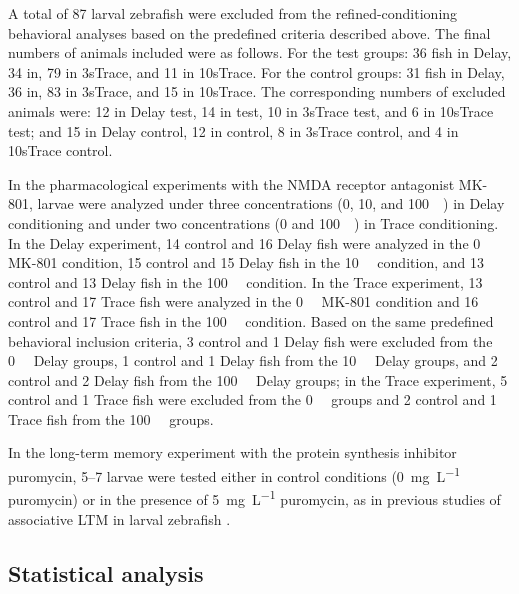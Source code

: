 A total of 87 larval zebrafish were excluded from the refined-conditioning behavioral analyses based on the predefined criteria described above. The final numbers of animals included were as follows. For the test groups: 36 fish in Delay, 34 in, 79 in 3sTrace, and 11 in 10sTrace. For the control groups: 31 fish in Delay, 36 in, 83 in 3sTrace, and 15 in 10sTrace. The corresponding numbers of excluded animals were: 12 in Delay test, 14 in test, 10 in 3sTrace test, and 6 in 10sTrace test; and 15 in Delay control, 12 in control, 8 in 3sTrace control, and 4 in 10sTrace control.

In the pharmacological experiments with the NMDA receptor antagonist MK-801, larvae were analyzed under three concentrations (0, 10, and \SI{100}{\micro\Molar}) in Delay conditioning and under two concentrations (0 and \SI{100}{\micro\Molar}) in Trace conditioning. In the Delay experiment, 14 control and 16 Delay fish were analyzed in the 0~\si{\micro\Molar} MK-801 condition, 15 control and 15 Delay fish in the 10~\si{\micro\Molar} condition, and 13 control and 13 Delay fish in the 100~\si{\micro\Molar} condition. In the Trace experiment, 13 control and 17 Trace fish were analyzed in the 0~\si{\micro\Molar} MK-801 condition and 16 control and 17 Trace fish in the 100~\si{\micro\Molar} condition. Based on the same predefined behavioral inclusion criteria, 3 control and 1 Delay fish were excluded from the 0~\si{\micro\Molar} Delay groups, 1 control and 1 Delay fish from the 10~\si{\micro\Molar} Delay groups, and 2 control and 2 Delay fish from the 100~\si{\micro\Molar} Delay groups; in the Trace experiment, 5 control and 1 Trace fish were excluded from the 0~\si{\micro\Molar} groups and 2 control and 1 Trace fish from the 100~\si{\micro\Molar} groups.

In the long-term memory experiment with the protein synthesis inhibitor puromycin, \SIrange{5}{7}{\dpf} larvae were tested either in control conditions (0~\si{\milli\gram\per\liter} puromycin) or in the presence of \SI{5}{\milli\gram\per\liter} puromycin, as in previous studies of associative LTM in larval zebrafish \citep{hinzProteinSynthesisDependentAssociative2013,dempseyRegionalSynapseGain2022}.


\subsection{Statistical analysis}

